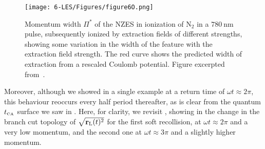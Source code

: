 \begin{figure}[b]
  \centering
  \texttt{[image: 6-LES/Figures/figure6O.png]}
  \caption[
  Measured momentum width of the NZES, compared with predictions from extraction-field theory, as observed by E. Diesen et al.
  ]{
  Momentum width $\Pi^*$ of the NZES in ionization of $\mathrm{N_2}$ in a $\SI{780}{\nano\meter}$ pulse, subsequently ionized by extraction fields of different strengths, showing some variation in the width of the feature with the extraction field strength. The red curve shows the predicted width of extraction from a rescaled Coulomb potential.
  Figure excerpted from~.
  }
\label{f6-diesen-scaling-original-figure}
\end{figure}


Moreover, although we showed in  a single example at a return time of $\omega t\approx 2\pi$, this behaviour reoccurs every half period thereafter, as is clear from the quantum ${t_{\scriptscriptstyle\mathrm{CA}}}$ surface we saw in . Here, for clarity, we revisit , showing in  the change in the branch cut topology of $\sqrt{\vb{r}_\mathrm{L}(t)^2}$ for the first soft recollision, at $\omega t\approx 2\pi$ and a very low momentum, and the second one at $\omega t\approx 3\pi$ and a slightly higher momentum.





